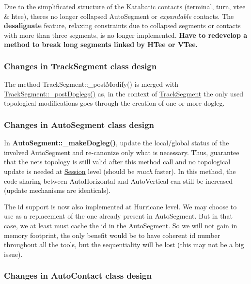 \begin{DoxyItemize}
\item Due to the simplificated structure of the Katabatic contacts (terminal, turn, vtee \& htee), there\textquotesingle{}s no longer collapsed Auto\+Segment or {\itshape expandable} contacts. The {\bfseries desalignate} feature, relaxing constraints due to collapsed segments or contacts with more than three segments, is no longer implemented. {\bfseries Have to redevelop a method to break long segments linked} {\bfseries by H\+Tee or V\+Tee.}
\end{DoxyItemize}\hypertarget{pageNotes_ssecModificationsTrackSegment}{}\subsubsection{Changes in Track\+Segment class design}\label{pageNotes_ssecModificationsTrackSegment}

\begin{DoxyItemize}
\item The method {\ttfamily Track\+Segment\+::\+\_\+post\+Modify()} is merged with \mbox{\hyperlink{classKite_1_1TrackSegment_a10a45c049d0bd7d01c7eff1c5441c7a2}{Track\+Segment\+::\+\_\+post\+Doglegs()}} as, in the context of \mbox{\hyperlink{classKite_1_1TrackSegment}{Track\+Segment}} the only used topological modifications goes through the creation of one or more dogleg.
\end{DoxyItemize}\hypertarget{pageNotes_ssecModificationsAutoSegment}{}\subsubsection{Changes in Auto\+Segment class design}\label{pageNotes_ssecModificationsAutoSegment}

\begin{DoxyItemize}
\item In \textbf{ Auto\+Segment\+::\+\_\+make\+Dogleg()}, update the local/global status of the involved Auto\+Segment and re-\/canonize only what is necessary. Thus, guarantee that the net\textquotesingle{}s topology is still valid after this method call and no topological update is needed at \mbox{\hyperlink{classKite_1_1Session}{Session}} level (should be {\itshape much} faster). In this method, the code sharing between Auto\+Horizontal and Auto\+Vertical can still be increased (update mechanisms are identicals).
\item The {\ttfamily id} support is now also implemented at Hurricane level. We may choose to use as a replacement of the one already present in Auto\+Segment. But in that case, we at least must cache the id in the Auto\+Segment. So we will not gain in memory footprint, the only benefit would be to have coherent id number throughout all the tools, but the sequentiality will be lost (this may not be a big issue).
\end{DoxyItemize}\hypertarget{pageNotes_ssecModificationsAutoContact}{}\subsubsection{Changes in Auto\+Contact class design}\label{pageNotes_ssecModificationsAutoContact}

